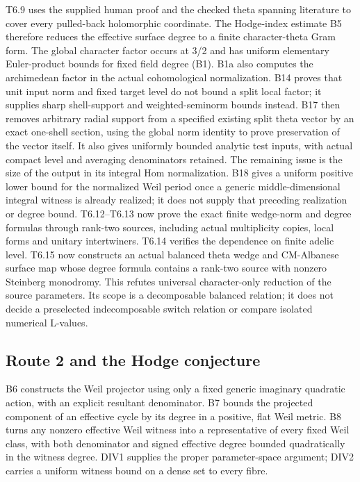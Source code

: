 \documentclass[11pt,a4paper]{article}
\theoremstyle{definition}
\begin{document}
T6.9 uses the supplied human proof and the checked theta spanning
literature to cover every pulled-back holomorphic coordinate. The
Hodge-index estimate B5 therefore reduces the effective surface degree
to a finite character-theta Gram form. The global character factor
occurs at 3/2 and has uniform elementary Euler-product bounds for fixed
field degree (B1). B1a also computes the archimedean factor in the
actual cohomological normalization. B14 proves that unit input norm and
fixed target level do not bound a split local factor; it supplies sharp
shell-support and weighted-seminorm bounds instead. B17 then removes
arbitrary radial support from a specified existing split theta vector by
an exact one-shell section, using the global norm identity to prove
preservation of the vector itself. It also gives uniformly bounded
analytic test inputs, with actual compact level and averaging
denominators retained. The remaining issue is the size of the output in
its integral Hom normalization. B18 gives a uniform positive lower bound
for the normalized Weil period once a generic middle-dimensional
integral witness is already realized; it does not supply that preceding
realization or degree bound. T6.12--T6.13 now prove the exact finite
wedge-norm and degree formulas through rank-two sources, including
actual multiplicity copies, local forms and unitary intertwiners. T6.14
verifies the dependence on finite adelic level. T6.15 now constructs an
actual balanced theta wedge and CM-Albanese surface map whose degree
formula contains a rank-two source with nonzero Steinberg monodromy.
This refutes universal character-only reduction of the source
parameters. Its scope is a decomposable balanced relation; it does not
decide a preselected indecomposable switch relation or compare isolated
numerical L-values.

\subsection{Route 2 and the Hodge
conjecture}\label{IMPLICATIONS-route-2-and-the-hodge-conjecture}

B6 constructs the Weil projector using only a fixed generic imaginary
quadratic action, with an explicit resultant denominator. B7 bounds the
projected component of an effective cycle by its degree in a positive,
flat Weil metric. B8 turns any nonzero effective Weil witness into a
representative of every fixed Weil class, with both denominator and
signed effective degree bounded quadratically in the witness degree.
DIV1 supplies the proper parameter-space argument; DIV2 carries a
uniform witness bound on a dense set to every fibre.
\end{document}
